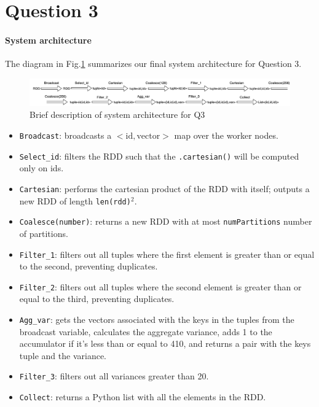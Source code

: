 \section{Question 3}

\paragraph{\textbf{System architecture}}
The diagram in Fig.\ref{fig:q3_diagram} summarizes our final system architecture for Question 3.

\begin{figure}[!h]
    \centering
    \includegraphics[width=.95\linewidth]{../assets/images/q3_diagram.png}
    \caption{Brief description of system architecture for Q3}
    \label{fig:q3_diagram}
\end{figure}

\begin{itemize}
    \item \texttt{Broadcast}: broadcasts a $<\textrm{id}, \textrm{vector}>$ map over the worker nodes.
    \item \texttt{Select_id}: filters the RDD such that the \texttt{.cartesian()} will be computed only on ids.
    \item \texttt{Cartesian}: performs the cartesian product of the RDD with itself; outputs a new RDD of length \texttt{len(rdd)}$^{2}$.
    \item \texttt{Coalesce(number)}: returns a new RDD with at most \texttt{numPartitions} number of partitions.
    \item \texttt{Filter_1}: filters out all tuples where the first element is greater than or equal to the second, preventing duplicates.
    \item \texttt{Filter_2}: filters out all tuples where the second element is greater than or equal to the third, preventing duplicates.
    \item \texttt{Agg_var}: gets the vectors associated with the keys in the tuples from the broadcast variable, calculates the aggregate variance, adds 1 to the accumulator if it's less than or equal to 410, and returns a pair with the keys tuple and the variance. 
    \item \texttt{Filter_3}: filters out all variances greater than 20.
    \item \texttt{Collect}: returns a Python list with all the elements in the RDD.
\end{itemize}

